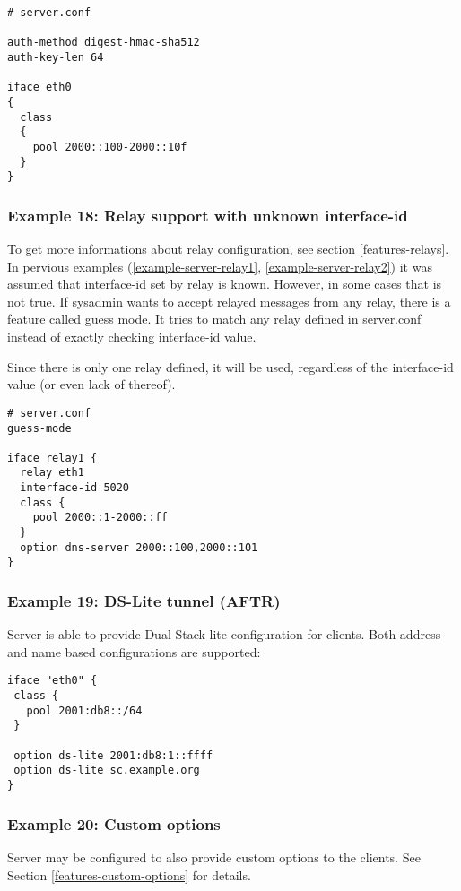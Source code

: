 \begin{lstlisting}
# server.conf

auth-method digest-hmac-sha512
auth-key-len 64

iface eth0
{
  class
  {
    pool 2000::100-2000::10f
  }
}
\end{lstlisting}

\subsubsection{Example 18: Relay support with unknown interface-id}
\label{example-server-relay3}
To get more informations about relay configuration, see section \ref{features-relays}.
In pervious examples (\ref{example-server-relay1},
\ref{example-server-relay2}) it was assumed that interface-id set by
relay is known. However, in some cases that is not true. If sysadmin
wants to accept relayed messages from any relay, there is a feature
called guess mode. It tries to match any relay defined in server.conf
instead of exactly checking interface-id value.

Since there is only one relay defined, it will be used, regardless of
the interface-id value (or even lack of thereof).

\begin{lstlisting}
# server.conf
guess-mode

iface relay1 {
  relay eth1
  interface-id 5020
  class {
    pool 2000::1-2000::ff
  }
  option dns-server 2000::100,2000::101
}
\end{lstlisting}


\subsubsection{Example 19: DS-Lite tunnel (AFTR)}
Server is able to provide Dual-Stack lite configuration for clients.
Both address and name based configurations are supported:

\begin{lstlisting}
iface "eth0" {
 class {
   pool 2001:db8::/64
 }

 option ds-lite 2001:db8:1::ffff
 option ds-lite sc.example.org
}
\end{lstlisting}

\subsubsection{Example 20: Custom options}
Server may be configured to also provide custom options to the
clients. See Section \ref{features-custom-options} for details.

